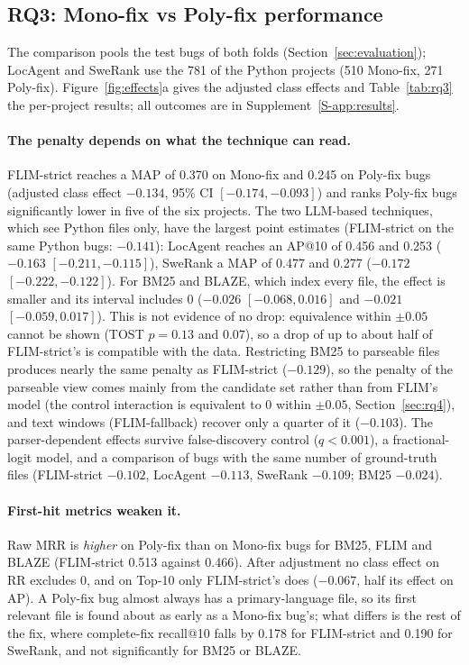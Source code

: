 \documentclass[a4paper,fleqn]{cas-dc}
\begin{document}
\subsection{RQ3: Mono-fix vs Poly-fix performance}\label{sec:rq3}

The comparison pools the test bugs of both folds (Section~\ref{sec:evaluation});
LocAgent and SweRank use the 781 of the Python projects (510 Mono-fix, 271
Poly-fix). Figure~\ref{fig:effects}a gives the adjusted class
effects and Table~\ref{tab:rq3} the per-project results; all outcomes are in
Supplement~\ref{S-app:results}.



\paragraph{The penalty depends on what the technique can read.} FLIM-strict
reaches a MAP of 0.370 on Mono-fix and 0.245 on Poly-fix bugs (adjusted class
effect $-0.134$, 95\% CI $[-0.174, -0.093]$) and ranks Poly-fix bugs
significantly lower in five of the six projects. The two LLM-based techniques,
which see Python files only, have the largest point estimates (FLIM-strict on
the same Python bugs: $-0.141$): LocAgent reaches an AP@10 of 0.456 and 0.253
($-0.163$ $[-0.211, -0.115]$), SweRank a MAP of 0.477 and 0.277 ($-0.172$
$[-0.222, -0.122]$). For BM25 and BLAZE, which index every file, the effect is
smaller and its interval includes 0 ($-0.026$ $[-0.068, 0.016]$ and $-0.021$
$[-0.059, 0.017]$). This is not evidence of no drop: equivalence within
$\pm0.05$ cannot be shown (TOST $p=0.13$ and $0.07$), so a drop of up to about
half of FLIM-strict's is compatible with the data. Restricting BM25 to
parseable files produces nearly the same penalty as FLIM-strict ($-0.129$), so
the penalty of the parseable view comes mainly from the candidate set rather
than from FLIM's model (the control interaction is equivalent to 0 within
$\pm0.05$, Section~\ref{sec:rq4}), and text windows (FLIM-fallback) recover only a quarter of it
($-0.103$). The parser-dependent effects survive false-discovery control
($q<0.001$), a fractional-logit model, and a comparison of bugs with the same
number of ground-truth files (FLIM-strict $-0.102$, LocAgent $-0.113$,
SweRank $-0.109$; BM25 $-0.024$).

\paragraph{First-hit metrics weaken it.} Raw MRR is \emph{higher} on Poly-fix
than on Mono-fix bugs for BM25, FLIM and BLAZE (FLIM-strict 0.513 against
0.466). After adjustment no class effect on RR excludes 0, and on
Top-10 only FLIM-strict's does ($-0.067$, half its effect on AP). A Poly-fix
bug almost always has a primary-language file, so its first relevant file is
found about as early as a Mono-fix bug's; what differs is the rest of the fix,
where complete-fix recall@10 falls by 0.178 for FLIM-strict and 0.190 for
SweRank, and not significantly for BM25 or BLAZE.
\end{document}
